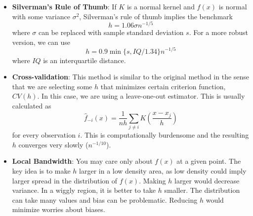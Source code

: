  \begin{itemize}
 \item\textbf{Silverman's Rule of Thumb}: If $K$ is a normal kernel and $f(x)$ is normal with some variance $\sigma^2$, Silverman's rule of thumb implies the benchmark
 \[
 h=1.06\sigma n^{-1/5}
 \]
 where $\sigma$ can be replaced with sample standard deviation $s$. For a more robust version, we can use
 \[
 h=0.9 \min\{s,IQ/1.34\}n^{-1/5}
 \]
 where $IQ$ is an interquartile distance. 
 \item\textbf{Cross-validation}: This method is similar to the original method in the sense that we are selecting some $h$ that minimizes certain criterion function, $CV(h)$. In this case, we are using a leave-one-out estimator. This is usually calculated as
 \[
 \hat{f}_{-i}(x) = \frac{1}{nh}\sum_{j\neq i}K\left(\frac{x-x_j}{h}\right)
 \]
 for every observation $i$. This is computationally burdensome and the resulting $h$ converges very slowly ($n^{-1/10}$). 
  \item\textbf{Local Bandwidth}: You may care only about $f(x)$ at a given point. The key idea is to make $h$ larger in a low density area, as low density could imply larger spread in the distribution of $f(x)$. Making $h$ larger would decrease variance. In a wiggly region, it is better to take $h$ smaller. The distribution can take many values and bias can be problematic. Reducing $h$ would minimize worries about biases. 
 \end{itemize}

